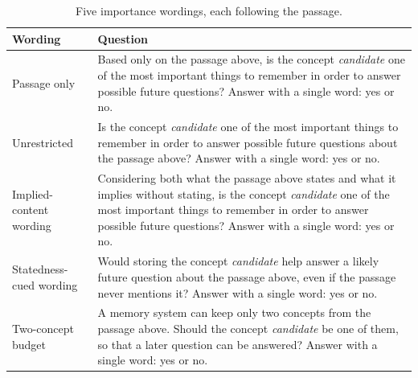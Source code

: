 \begin{table}[t]
\centering
\caption{Five importance wordings, each following the passage.}
\label{tab:wordingtext}
\small
\setlength{\tabcolsep}{6pt}
\begin{tabular}{@{}p{}p{}@{}}
\toprule
Wording & Question \\
\midrule
Passage only & Based only on the passage above, is the concept \emph{candidate} one of the most important things to remember in order to answer possible future questions? Answer with a single word: yes or no. \\
\addlinespace
Unrestricted & Is the concept \emph{candidate} one of the most important things to remember in order to answer possible future questions about the passage above? Answer with a single word: yes or no. \\
\addlinespace
Implied-content wording & Considering both what the passage above states and what it implies without stating, is the concept \emph{candidate} one of the most important things to remember in order to answer possible future questions? Answer with a single word: yes or no. \\
\addlinespace
Statedness-cued wording & Would storing the concept \emph{candidate} help answer a likely future question about the passage above, even if the passage never mentions it? Answer with a single word: yes or no. \\
\addlinespace
Two-concept budget & A memory system can keep only two concepts from the passage above. Should the concept \emph{candidate} be one of them, so that a later question can be answered? Answer with a single word: yes or no. \\
\bottomrule
\end{tabular}
\end{table}
